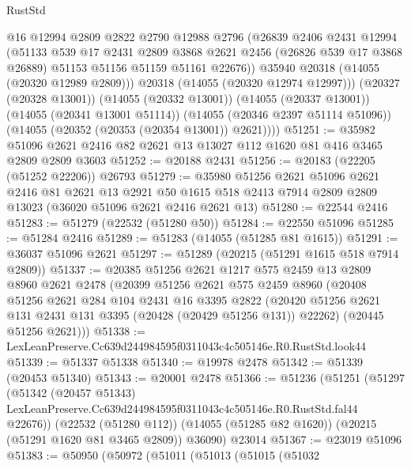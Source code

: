 \begin{lexlean}{RustStd}
\begin{coremodule}
            @16
            @12994
            @2809
            @2822
            @2790
            @12988
            @2796
            (@26839
              @2406
              @2431
              @12994
              (@51133
                @539
                @17
                @2431
                @2809
                @3868
                @2621
                @2456
                (@26826 @539 @17 @3868 @26889)
                @51153
                @51156
                @51159
                @51161
                @22676))
            @35940
            @20318
            (@14055 (@20320 @12989 @2809)))
          @20318
          (@14055 (@20320 @12974 @12997)))
        (@20327 (@20328 @13001))
        (@14055 (@20332 @13001))
        (@14055 (@20337 @13001))
        (@14055 (@20341 @13001 @51114))
        (@14055 (@20346 @2397 @51114 @51096))
        (@14055 (@20352 (@20353 (@20354 @13001)) @2621))))
@51251 := @35982 @51096 @2621 @2416 @82 @2621 @13 @13027 @112 @1620 @81 @416 @3465 @2809 @2809 @3603
@51252 := @20188 @2431
@51256 := @20183 (@22205 (@51252 @22206)) @26793
@51279 := @35980
    @51256
    @2621
    @51096
    @2621
    @2416
    @81
    @2621
    @13
    @2921
    @50
    @1615
    @518
    @2413
    @7914
    @2809
    @2809
    @13023
    (@36020 @51096 @2621 @2416 @2621 @13)
@51280 := @22544 @2416
@51283 := @51279 (@22532 (@51280 @50))
@51284 := @22550 @51096
@51285 := @51284 @2416
@51289 := @51283 (@14055 (@51285 @81 @1615))
@51291 := @36037 @51096 @2621
@51297 := @51289 (@20215 (@51291 @1615 @518 @7914 @2809))
@51337 := @20385
    @51256
    @2621
    @1217
    @575
    @2459
    @13
    @2809
    @8960
    @2621
    @2478
    (@20399
      @51256
      @2621
      @575
      @2459
      @8960
      (@20408
        @51256
        @2621
        @284
        @104
        @2431
        @16
        @3395
        @2822
        (@20420 @51256 @2621 @131 @2431 @131 @3395 (@20428 (@20429 @51256 @131)) @22262)
        (@20445 @51256 @2621)))
@51338 := LexLeanPreserve.Cc639d244984595f0311043c4c505146e.R0.RustStd.look44
@51339 := @51337 @51338
@51340 := @19978 @2478
@51342 := @51339 (@20453 @51340)
@51343 := @20001 @2478
@51366 := @51236
    (@51251
      (@51297
        (@51342
          (@20457 @51343)
          LexLeanPreserve.Cc639d244984595f0311043c4c505146e.R0.RustStd.fal44
          @22676))
      (@22532 (@51280 @112))
      (@14055 (@51285 @82 @1620))
      (@20215 (@51291 @1620 @81 @3465 @2809))
      @36090)
    @23014
@51367 := @23019 @51096
@51383 := @50950
    (@50972
      (@51011
        (@51013
          (@51015
            (@51032

\end{coremodule}
\end{lexlean}
